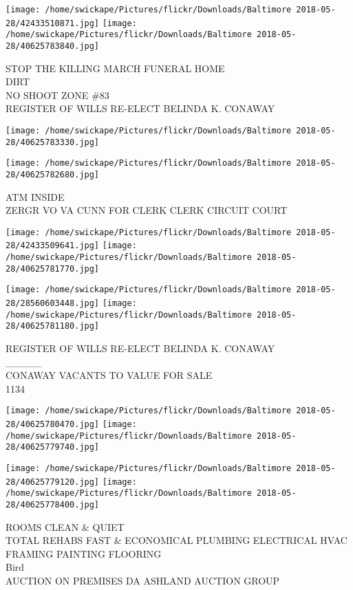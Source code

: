 \documentclass[10pt,letterpaper]{article}
\begin{document}
\texttt{[image: /home/swickape/Pictures/flickr/Downloads/Baltimore 2018-05-28/42433510871.jpg]}
\texttt{[image: /home/swickape/Pictures/flickr/Downloads/Baltimore 2018-05-28/40625783840.jpg]}

STOP THE KILLING MARCH FUNERAL HOME\\
DIRT\\
NO SHOOT ZONE \#83\\
REGISTER OF WILLS RE{-}ELECT BELINDA K. CONAWAY\\
\pagebreak

\texttt{[image: /home/swickape/Pictures/flickr/Downloads/Baltimore 2018-05-28/40625783330.jpg]}

\vspace{0.25in}
\texttt{[image: /home/swickape/Pictures/flickr/Downloads/Baltimore 2018-05-28/40625782680.jpg]}

ATM INSIDE\\
ZERGR VO VA CUNN FOR CLERK CLERK CIRCUIT COURT\\
\pagebreak

\texttt{[image: /home/swickape/Pictures/flickr/Downloads/Baltimore 2018-05-28/42433509641.jpg]}
\texttt{[image: /home/swickape/Pictures/flickr/Downloads/Baltimore 2018-05-28/40625781770.jpg]}

\texttt{[image: /home/swickape/Pictures/flickr/Downloads/Baltimore 2018-05-28/28560603448.jpg]}
\texttt{[image: /home/swickape/Pictures/flickr/Downloads/Baltimore 2018-05-28/40625781180.jpg]}

REGISTER OF WILLS RE{-}ELECT BELINDA K. CONAWAY\\
\_\_\_\_\_\\
CONAWAY VACANTS TO VALUE FOR SALE\\
1134\\
\pagebreak

\texttt{[image: /home/swickape/Pictures/flickr/Downloads/Baltimore 2018-05-28/40625780470.jpg]}
\texttt{[image: /home/swickape/Pictures/flickr/Downloads/Baltimore 2018-05-28/40625779740.jpg]}

\texttt{[image: /home/swickape/Pictures/flickr/Downloads/Baltimore 2018-05-28/40625779120.jpg]}
\texttt{[image: /home/swickape/Pictures/flickr/Downloads/Baltimore 2018-05-28/40625778400.jpg]}

ROOMS CLEAN \& QUIET\\
TOTAL REHABS FAST \& ECONOMICAL PLUMBING ELECTRICAL HVAC FRAMING PAINTING FLOORING\\
Bird\\
AUCTION ON PREMISES DA ASHLAND AUCTION GROUP\\
\pagebreak
\end{document}
